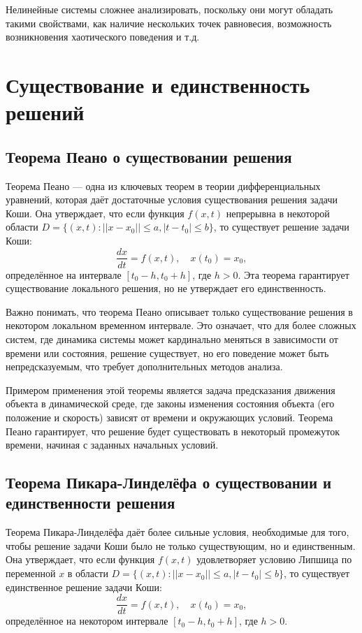 \documentclass[a4paper,14pt]{extarticle} %
\begin{document}
Нелинейные системы сложнее анализировать, поскольку они могут обладать такими свойствами, как наличие нескольких точек равновесия, возможность возникновения хаотического поведения и т.д.

\newpage

\section{Существование и единственность решений}

\subsection{Теорема Пеано о существовании решения}
Теорема Пеано — одна из ключевых теорем в теории дифференциальных уравнений, которая даёт достаточные условия существования решения задачи Коши. Она утверждает, что если функция \( f(x, t) \) непрерывна в некоторой области \( D = \{ (x, t): ||x - x_0|| \leq a, |t - t_0| \leq b \} \), то существует решение задачи Коши:
\[
\frac{dx}{dt} = f(x, t), \quad x(t_0) = x_0,
\]
определённое на интервале \( [t_0 - h, t_0 + h] \), где \( h > 0 \). Эта теорема гарантирует существование локального решения, но не утверждает его единственность.

Важно понимать, что теорема Пеано описывает только существование решения в некотором локальном временном интервале. Это означает, что для более сложных систем, где динамика системы может кардинально меняться в зависимости от времени или состояния, решение существует, но его поведение может быть непредсказуемым, что требует дополнительных методов анализа.

Примером применения этой теоремы является задача предсказания движения объекта в динамической среде, где законы изменения состояния объекта (его положение и скорость) зависят от времени и окружающих условий. Теорема Пеано гарантирует, что решение будет существовать в некоторый промежуток времени, начиная с заданных начальных условий.

\subsection{Теорема Пикара-Линделёфа о существовании и единственности решения}
Теорема Пикара-Линделёфа даёт более сильные условия, необходимые для того, чтобы решение задачи Коши было не только существующим, но и единственным. Она утверждает, что если функция \( f(x, t) \) удовлетворяет условию Липшица по переменной \( x \) в области \( D = \{ (x, t): ||x - x_0|| \leq a, |t - t_0| \leq b \} \), то существует единственное решение задачи Коши:
\[
\frac{dx}{dt} = f(x, t), \quad x(t_0) = x_0,
\]
определённое на некотором интервале \( [t_0 - h, t_0 + h] \), где \( h > 0 \).
\end{document}
